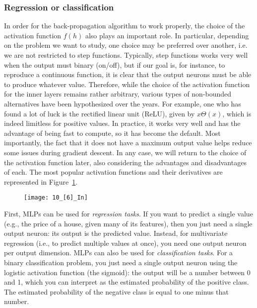 \subsubsection*{Regression or classification}
In order for the back-propagation algorithm to work properly, the choice of the activation function $f(h)$ also plays an important role. In particular, depending on the problem we want to study, one choice may be preferred over another, i.e. we are not restricted to step functions. Typically, step functions works very well when the output must binary (on/off), but if our goal is, for instance, to reproduce a continuous function, it is clear that the output neurons must be able to produce whatever value. Therefore, while the choice of the activation function for the inner layers remains rather arbitrary, various types of non-bounded alternatives have been hypothesized over the years. For example, one who has found a lot of luck is the rectified linear unit (ReLU), given by $x\Theta(x)$, which is indeed limitless for positive values. In practice, it works very well and has the advantage of being fast to compute, so it has become the default. Most importantly, the fact that it does not have a maximum output value helps reduce some issues during gradient descent. In any case, we will return to the choice of the activation function later, also considering the advantages and disadvantages of each. The most popular activation functions and their derivatives are represented in Figure~\ref{10_[6]_In}.
\begin{figure}[h!t]
\centering
\texttt{[image: 10\_[6]\_In]}
\caption{}\label{10_[6]_In}
\end{figure}

First, MLPs can be used for \emph{regression tasks}. If you want to predict a single value (e.g., the price of a house, given many of its features), then you just need a single output neuron: its output is the predicted value. Instead, for multivariate regression (i.e., to predict multiple values at once), you need one output neuron per output dimension.
MLPs can also be used for \emph{classification tasks}. For a binary classification problem, you just need a single output neuron using the logistic activation function (the sigmoid): the output will be a number between 0 and 1, which you can interpret as the estimated probability of the positive class. The estimated probability of the negative class is equal to one minus that number.

